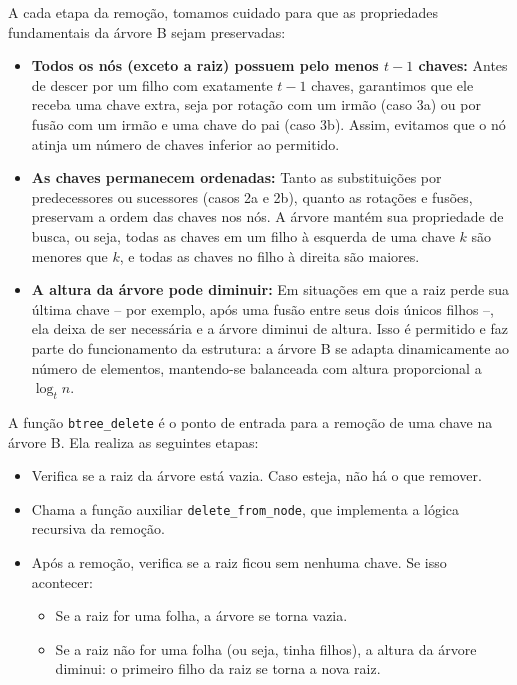A cada etapa da remoção, tomamos cuidado para que as propriedades fundamentais da árvore B sejam preservadas:

\begin{itemize}
  \item \textbf{Todos os nós (exceto a raiz) possuem pelo menos \( t - 1 \) chaves:}  
  Antes de descer por um filho com exatamente \( t - 1 \) chaves, garantimos que ele receba uma chave extra, seja por rotação com um irmão (caso 3a) ou por fusão com um irmão e uma chave do pai (caso 3b). 
  Assim, evitamos que o nó atinja um número de chaves inferior ao permitido.
  
  \item \textbf{As chaves permanecem ordenadas:}  
  Tanto as substituições por predecessores ou sucessores (casos 2a e 2b), quanto as rotações e fusões, preservam a ordem das chaves nos nós. 
  A árvore mantém sua propriedade de busca, ou seja, todas as chaves em um filho à esquerda de uma chave \( k \) são menores que \( k \), e todas as chaves no filho à direita são maiores.
  
  \item \textbf{A altura da árvore pode diminuir:}  
  Em situações em que a raiz perde sua última chave -- por exemplo, após uma fusão entre seus dois únicos filhos --, ela deixa de ser necessária e a árvore diminui de altura. 
  Isso é permitido e faz parte do funcionamento da estrutura: a árvore B se adapta dinamicamente ao número de elementos, mantendo-se balanceada com altura proporcional a \( \log_t n \).
\end{itemize}

A função \texttt{btree\_delete} é o ponto de entrada para a remoção de uma chave na árvore B. Ela realiza as seguintes etapas:

\begin{itemize}
  \item Verifica se a raiz da árvore está vazia. Caso esteja, não há o que remover.
  \item Chama a função auxiliar \texttt{delete\_from\_node}, que implementa a lógica recursiva da remoção.
  \item Após a remoção, verifica se a raiz ficou sem nenhuma chave. Se isso acontecer:
    \begin{itemize}
      \item Se a raiz for uma folha, a árvore se torna vazia.
      \item Se a raiz não for uma folha (ou seja, tinha filhos), a altura da árvore diminui: o primeiro filho da raiz se torna a nova raiz.
    \end{itemize}
\end{itemize}

